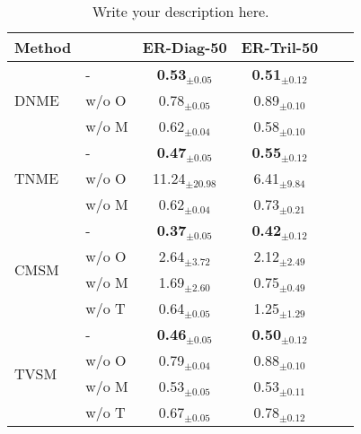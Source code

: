 
\begin{table}[t]
\caption{Write your description here.}
\label{sample-table}
\vskip 0.15in
\begin{center}
\begin{small}
\begin{sc}
\begin{tabular}{llcccc}
\toprule
Method &  & ER-Diag-50 & ER-Tril-50 \\
\midrule
\multirow{3}{*}{DNME} & -     & \textbf{0.53}$_{\pm \mathbf{0.05}}$ & \textbf{0.51}$_{\pm \mathbf{0.12}}$ \\
                             & w/o O & 0.78$_{\pm 0.05}$ & 0.89$_{\pm 0.10}$ \\
                             & w/o M & 0.62$_{\pm 0.04}$ & 0.58$_{\pm 0.10}$ \\
\midrule
\multirow{3}{*}{TNME} & -     & \textbf{0.47}$_{\pm \mathbf{0.05}}$ & \textbf{0.55}$_{\pm \mathbf{0.12}}$ \\
                             & w/o O & 11.24$_{\pm 20.98}$ & 6.41$_{\pm 9.84}$ \\
                             & w/o M & 0.62$_{\pm 0.04}$ & 0.73$_{\pm 0.21}$ \\
\midrule
\multirow{4}{*}{CMSM} & -     & \textbf{0.37}$_{\pm \mathbf{0.05}}$ & \textbf{0.42}$_{\pm \mathbf{0.12}}$ \\
                             & w/o O & 2.64$_{\pm 3.72}$ & 2.12$_{\pm 2.49}$ \\
                             & w/o M & 1.69$_{\pm 2.60}$ & 0.75$_{\pm 0.49}$ \\
                             & w/o T & 0.64$_{\pm 0.05}$ & 1.25$_{\pm 1.29}$ \\
\midrule
\multirow{4}{*}{TVSM} & -     & \textbf{0.46}$_{\pm \mathbf{0.05}}$ & \textbf{0.50}$_{\pm \mathbf{0.12}}$ \\
                             & w/o O & 0.79$_{\pm 0.04}$ & 0.88$_{\pm 0.10}$ \\
                             & w/o M & 0.53$_{\pm 0.05}$ & 0.53$_{\pm 0.11}$ \\
                             & w/o T & 0.67$_{\pm 0.05}$ & 0.78$_{\pm 0.12}$ \\
\bottomrule
\end{tabular}
\end{sc}
\end{small}
\end{center}
\vskip -0.1in
\end{table}
